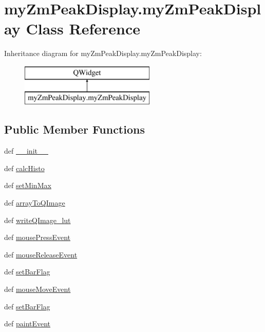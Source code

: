 \hypertarget{classmy_zm_peak_display_1_1my_zm_peak_display}{\section{my\-Zm\-Peak\-Display.\-my\-Zm\-Peak\-Display Class Reference}
\label{classmy_zm_peak_display_1_1my_zm_peak_display}
}
Inheritance diagram for my\-Zm\-Peak\-Display.\-my\-Zm\-Peak\-Display\-:\begin{figure}[H]
\begin{center}
\leavevmode
\includegraphics[height=2.000000cm]{classmy_zm_peak_display_1_1my_zm_peak_display}
\end{center}
\end{figure}
\subsection*{Public Member Functions}
\begin{DoxyCompactItemize}
\item 
def \hyperlink{classmy_zm_peak_display_1_1my_zm_peak_display_a348a15b190a012ffee26f7526d2eca3c}{\-\_\-\-\_\-init\-\_\-\-\_\-}
\item 
def \hyperlink{classmy_zm_peak_display_1_1my_zm_peak_display_aab9ac5a869bd132456f71fe022b2ad65}{calc\-Histo}
\item 
def \hyperlink{classmy_zm_peak_display_1_1my_zm_peak_display_a3a7fbef40f5613213deb5367a19f7857}{set\-Min\-Max}
\item 
def \hyperlink{classmy_zm_peak_display_1_1my_zm_peak_display_af002add8e8eb6c55820cc2e12a8457c9}{array\-To\-Q\-Image}
\item 
def \hyperlink{classmy_zm_peak_display_1_1my_zm_peak_display_ae50e3adcca21aee551f8d757d77b9eba}{write\-Q\-Image\-\_\-lut}
\item 
def \hyperlink{classmy_zm_peak_display_1_1my_zm_peak_display_abd1762a6b6ac58060a7a3d5f2fc4ff1a}{mouse\-Press\-Event}
\item 
def \hyperlink{classmy_zm_peak_display_1_1my_zm_peak_display_a7bce038050bb5bdd6b3d58be7ef13f00}{mouse\-Release\-Event}
\item 
def \hyperlink{classmy_zm_peak_display_1_1my_zm_peak_display_a86086ce776ea26bbb7c84dd6f49a3064}{set\-Bar\-Flag}
\item 
def \hyperlink{classmy_zm_peak_display_1_1my_zm_peak_display_ada885fc1335a833a72ce8f65078c1fab}{mouse\-Move\-Event}
\item 
def \hyperlink{classmy_zm_peak_display_1_1my_zm_peak_display_a86086ce776ea26bbb7c84dd6f49a3064}{set\-Bar\-Flag}
\item 
def \hyperlink{classmy_zm_peak_display_1_1my_zm_peak_display_a45a5009c5ecc96d9a6ff350600478b37}{paint\-Event}
\end{DoxyCompactItemize}
